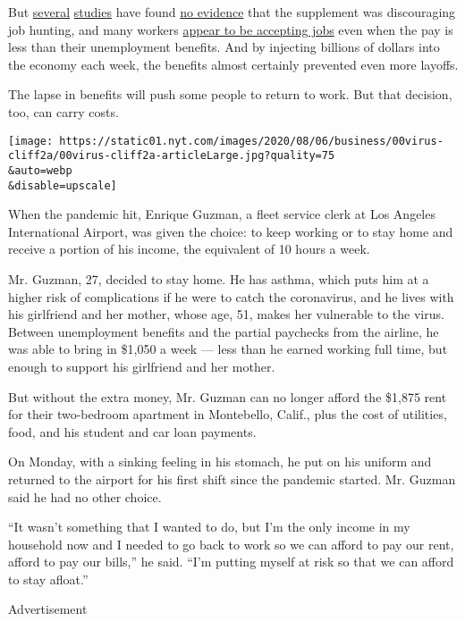 But
\href{https://papers.ssrn.com/sol3/papers.cfm?abstract_id=3664265}{several}
\href{https://www.dropbox.com/s/q0kcoix35jxt1u4/UI_Employment_HPS.pdf?dl=0}{studies}
have found
\href{https://news.yale.edu/2020/07/27/yale-study-finds-expanded-jobless-benefits-did-not-reduce-employment}{no
evidence} that the supplement was discouraging job hunting, and many
workers
\href{https://twitter.com/ernietedeschi/status/1283832188434362368}{appear
to be accepting jobs} even when the pay is less than their unemployment
benefits. And by injecting billions of dollars into the economy each
week, the benefits almost certainly prevented even more layoffs.

The lapse in benefits will push some people to return to work. But that
decision, too, can carry costs.

\texttt{[image: https://static01.nyt.com/images/2020/08/06/business/00virus-cliff2a/00virus-cliff2a-articleLarge.jpg?quality=75\\\&auto=webp\\\&disable=upscale]}

When the pandemic hit, Enrique Guzman, a fleet service clerk at Los
Angeles International Airport, was given the choice: to keep working or
to stay home and receive a portion of his income, the equivalent of 10
hours a week.

Mr. Guzman, 27, decided to stay home. He has asthma, which puts him at a
higher risk of complications if he were to catch the coronavirus, and he
lives with his girlfriend and her mother, whose age, 51, makes her
vulnerable to the virus. Between unemployment benefits and the partial
paychecks from the airline, he was able to bring in \$1,050 a week ---
less than he earned working full time, but enough to support his
girlfriend and her mother.

But without the extra money, Mr. Guzman can no longer afford the \$1,875
rent for their two-bedroom apartment in Montebello, Calif., plus the
cost of utilities, food, and his student and car loan payments.

On Monday, with a sinking feeling in his stomach, he put on his uniform
and returned to the airport for his first shift since the pandemic
started. Mr. Guzman said he had no other choice.

``It wasn't something that I wanted to do, but I'm the only income in my
household now and I needed to go back to work so we can afford to pay
our rent, afford to pay our bills,'' he said. ``I'm putting myself at
risk so that we can afford to stay afloat.''

Advertisement

